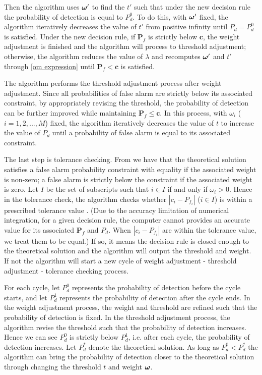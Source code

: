 Then the algorithm uses $\boldsymbol{\omega}'$ to find the $t'$ such that under the new decision rule the probability of detection is equal to  $P_d^0$. To do this, with $\boldsymbol{\omega}'$ fixed, the algorithm iteratively decreases the value of $t'$ from positive infinity until $P_d = P_d^0$ is satisfied. Under the new decision rule, if $\mathbf{P}_f$ is strictly below $\mathbf{c}$, the weight adjustment is finished and the algorithm will process to  threshold adjustment; otherwise, the algorithm reduces the value of $\lambda$ and recomputes $\boldsymbol{\omega}'$ and $t'$ through \eqref{om expression} until $\mathbf{P}_f < \mathbf{c}$  is satisfied. 

 The algorithm performs the threshold adjustment process after weight adjustment. Since all probabilities of false alarm are strictly below its associated constraint, by appropriately revising the threshold, the probability of detection can be further improved while maintaining $\mathbf{P}_f \leq \mathbf{c}$. In this process, with $\omega_i$ ($i=1, 2, ..., M$) fixed, the algorithm iteratively decreases the value of $t$ to increase the value of $P_d$ until a probability of false alarm is equal to its associated constraint.  

The last step is tolerance checking. From \cite{zhang2000efficient} we have that the theoretical solution satisfies a false alarm probability constraint with equality if the associated weight is non-zero; a false alarm is strictly below the constraint if the associated weight is zero. 
Let $I$ be the set of subscripts such that $i \in I$ if and only if $\omega_i > 0$. 
Hence in the tolerance check, the algorithm checks whether $|c_i - P_{f_i}|$ ($i \in I$) is within a prescribed tolerance value . 
(Due to the accuracy limitation of numerical integration, for a given decision rule, the computer cannot provides an accurate value for its associated $\mathbf{P}_f$ and $P_d$. When $|c_i - P_{f_i}|$ are within the tolerance value, we treat them to be equal.) 
If so, it means the decision rule is closed enough to the theoretical solution and the algorithm will output the threshold and weight.  If not the algorithm will start a new cycle of weight adjustment - threshold adjustment - tolerance checking process. 

For each cycle, let $P_d^0$ represents the probability of detection before the cycle starts, and let $P_d^1$ represents the probability of detection after the cycle ends. In the weight adjustment process, the weight and threshold are refined such that the probability of detection is fixed. In the threshold adjustment process, the algorithm revise the threshold such that the probability of detection increases. Hence we can see $P_d^0$ is strictly below $P_d^1$, i.e. after each cycle, the probability of detection increases. Let $P_d^\ast$ denote the theoretical solution. As long as $P_d^0 < P_d^\ast$  the algorithm can bring the probability of detection closer to the theoretical solution  through changing the threshold $t$ and weight $\boldsymbol{\omega}$.

